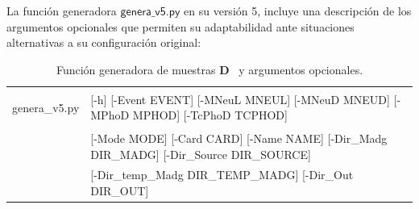 La función generadora $\textsf{genera\_v5.py}$ en su versión 5, incluye una descripción de los argumentos opcionales que permiten su adaptabilidad ante situaciones alternativas a su configuración original:

\begin{table}[!ht]
\begin{center}
\scriptsize
\begin{tabular}{|ll|}
\toprule
\begin{small}genera\_v5.py \end{small} & [-h] [-Event EVENT] [-MNeuL MNEUL] [-MNeuD MNEUD] [-MPhoD MPHOD] [-TcPhoD TCPHOD]\\
&[-Mode MODE] [-Card CARD] [-Name NAME] [-Dir\_Madg DIR\_MADG] [-Dir\_Source DIR\_SOURCE]\\
& [-Dir\_temp\_Madg DIR\_TEMP\_MADG] [-Dir\_Out DIR\_OUT]\\
\bottomrule 
\end{tabular}%
\caption{Función generadora de muestras \MSSM\textbf{D}~ y argumentos opcionales.}
\label{table_genera_v5}
\end{center}
\end{table}

